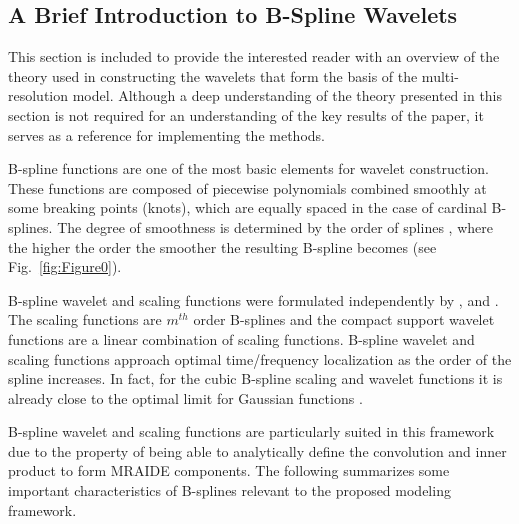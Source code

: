 \documentclass[review,authoryear,3p]{elsarticle}
\begin{document}
\subsection{A Brief Introduction to B-Spline Wavelets}
This section is included to provide the interested reader with an overview of the theory used in constructing the wavelets that form the basis of the multi-resolution model. Although a deep understanding of the theory presented in this section is not required for an understanding of the key results of the paper, it serves as a reference for implementing the methods.

B-spline functions are one of the most basic elements for wavelet construction. These functions are composed of piecewise polynomials combined smoothly at some breaking points (knots), which are equally spaced in the case of cardinal B-splines. The degree of smoothness is determined by the order of splines \citep{Goswami1999}, where the higher the order the smoother the resulting B-spline becomes (see Fig.~\ref{fig:Figure0}).

 
B-spline wavelet and scaling functions were formulated independently by \citet{Chui1992b}, \citet{Chui1992} and \citet{Unser1993}.  The scaling functions are $m^{th}$ order B-splines and the compact support wavelet functions are a linear combination of scaling functions. B-spline wavelet and scaling functions approach optimal time/frequency localization as the order of the spline increases. In fact, for the cubic B-spline scaling and wavelet functions it is already close to the optimal limit for Gaussian functions \citep{Unser1999}. 

B-spline wavelet and scaling functions are particularly suited in this framework due to the property of being able to analytically define the convolution and inner product to form MRAIDE components. The following summarizes some important characteristics of B-splines relevant to the proposed modeling framework. 
\end{document}
